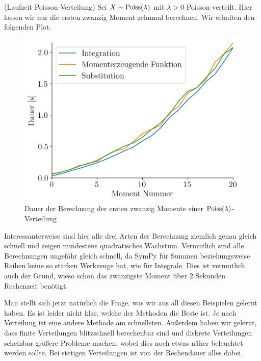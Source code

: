 \begin{Beispiel}{(Laufzeit Poisson-Verteilung)}
Sei $X \sim \operatorname{Poiss}(\lambda)$ mit $\lambda > 0$ Poisson-verteilt. Hier lassen wir nur die ersten zwanzig Moment zehnmal berechnen. Wir erhalten den folgenden Plot.

\begin{figure}[H]
\centering
\includegraphics[width=0.5\linewidth]{./Section/Momente/Dauer Poisson.png}
\vspace*{-.3\baselineskip}
\caption{Dauer der Berechnung der ersten zwanzig Momente einer $\operatorname{Poiss}(\lambda)$-Verteilung}
\end{figure}

Interessanterweise sind hier alle drei Arten der Berechnung ziemlich genau gleich schnell und zeigen mindestens quadratisches Wachstum. Vermutlich sind alle Berechnungen ungefähr gleich schnell, da SymPy für Summen beziehungsweise Reihen keine so starken Werkzeuge hat, wie für Integrale. Dies ist vermutlich auch der Grund, wieso schon das zwanzigste Moment über $2$ Sekunden Rechenzeit benötigt.
\end{Beispiel}

Man stellt sich jetzt natürlich die Frage, was wir aus all diesen Beispielen gelernt haben. Es ist leider nicht klar, welche der Methoden \glqq die Beste\grqq{} ist. Je nach Verteilung ist eine andere Methode am schnellsten. Außerdem haben wir gelernt, dass finite Verteilungen blitzschnell berechenbar sind und diskrete Verteilungen scheinbar größere Probleme machen, wobei dies noch etwas näher beleuchtet werden sollte. Bei stetigen Verteilungen ist von der Rechendauer alles dabei.
